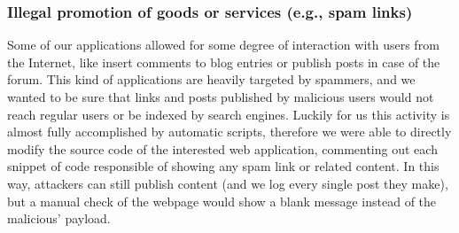 \subsubsection{Illegal promotion of goods or services (e.g., spam links)}

 Some of our applications allowed for some degree of interaction with users from the Internet, like insert comments to blog entries or publish posts in case of the forum. This kind of applications are heavily targeted by spammers, and we wanted to be sure that links and posts published by malicious users would not reach regular users or be indexed by search engines. Luckily for us this activity is almost fully accomplished by automatic scripts, therefore we were able to directly modify the source code of the interested web application, commenting out each snippet of code responsible of showing any spam link or related content. In this way, attackers can still publish content (and we log every single post they make), but a manual check of the webpage would show a blank message instead of the malicious' payload.

